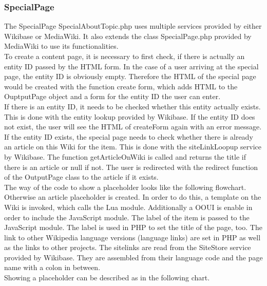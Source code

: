 \subsubsection{SpecialPage}

The SpecialPage SpecialAboutTopic.php uses multiple services provided by either Wikibase or MediaWiki. It also extends the class SpecialPage.php provided by MediaWiki to use its functionalities. \\
To create a content page, it is necessary to first check, if there is actually an entity ID passed by the HTML form. In the case of a user arriving at the special page, the entity ID is obviously empty. Therefore the HTML of the special page would be created with the function create form, which adds HTML to the OuptputPage object and a form for the entity ID the user can enter. \\
If there is an entity ID, it needs to be checked whether this entity actually exists. This is done with the entity lookup provided by Wikibase. If the entity ID does not exist, the user will see the HTML of createForm again with an error message.
If the entity ID exists, the special page needs to check whether there is already an article on this Wiki for the item. This is done with the siteLinkLoopup service by Wikibase. The function getArticleOnWiki is called and returns the title if there is an article or null if not. The user is redirected with the redirect function of the OutputPage class to the article if it exists.  \\
The way of the code to show a placeholder looks like the following flowchart. \\



Otherwise an article placeholder is created. In order to do this, a template on the Wiki is invoked, which calls the Lua module. Additionally a OOUI is enable in order to include the JavaScript module. The label of the item is passed to the JavaScript module. The label is used in PHP to set the title of the page, too. The link to other Wikipedia language versions (language links) are set in PHP as well as the links to other projects. The sitelinks are read from the SiteStore service provided by Wikibase. They are assembled from their language code and the page name with a colon in between. \\
Showing a placeholder can be described as in the following chart. \\ 

